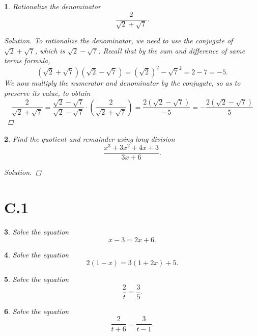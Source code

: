 \documentclass[12pt]{amsart}
\newtheorem{thm}{}
\begin{document}
\setcounter{thm}{42}
\begin{thm}
  Rationalize the denominator
  $$\frac{2}{\sqrt{2} + \sqrt{7}}.$$
  
  \begin{proof}[Solution]
    To rationalize the denominator, we need to use the conjugate of $\sqrt{2} + \sqrt{7}$, which is $\sqrt{2} - \sqrt{7}$.
    Recall that by the sum and difference of same terms formula, 
    $$(\sqrt{2} + \sqrt{7})(\sqrt{2} - \sqrt{7}) = (\sqrt{2})^2 - \sqrt{7}^2 = 2 - 7 = -5.$$
    We now multiply the numerator and denominator by the conjugate, so as to preserve its value, to obtain
    $$\frac{2}{\sqrt{2} + \sqrt{7}} = \frac{\sqrt{2} - \sqrt{7}}{\sqrt{2} - \sqrt{7}} \cdot \left(\frac{2}{\sqrt{2} + \sqrt{7}}\right) = \frac{2(\sqrt{2} - \sqrt{7})}{-5} = -\frac{2(\sqrt{2} - \sqrt{7})}{5}$$
  \end{proof}
\end{thm}

\setcounter{thm}{49}
\begin{thm}
  Find the quotient and remainder using long division
  $$\frac{x^3 + 3x^2 + 4x + 3}{3x + 6}.$$
  \begin{proof}[Solution]
    
  \end{proof}
\end{thm}

\section*{C.1}
\setcounter{thm}{8}
\begin{thm}
  Solve the equation
  $$x - 3 = 2x + 6.$$
\end{thm}

\setcounter{thm}{12}
\begin{thm}
  Solve the equation
  $$2(1 - x) = 3(1 + 2x) + 5.$$
\end{thm}

\setcounter{thm}{22}
\begin{thm}
  Solve the equation
  $$\frac{2}{t} = \frac{3}{5}.$$
\end{thm}

\setcounter{thm}{26}
\begin{thm}
  Solve the equation
  $$\frac{2}{t + 6} = \frac{3}{t - 1}.$$
\end{thm}
\end{document}

